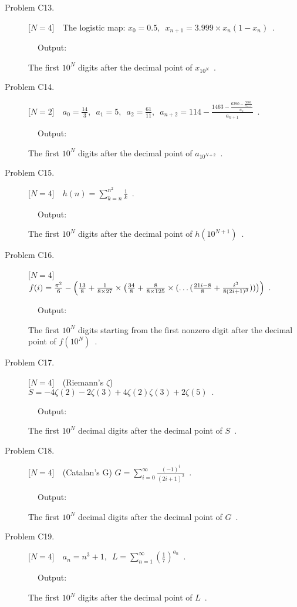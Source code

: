 \documentclass{article}
\begin{document}
\begin{description}
\item[Problem C13.] [$N=4$]~~The logistic map: $x_0=0.5,\enspace x_{n+1}=3.999\times x_{n} (1-x_{n})\enspace.$
\item[~~~~~~~~Output:]The first \ensuremath{10^N} digits after the decimal point of  $x_{\ensuremath{10^N}}\enspace$.

\item[Problem C14.] [$N=2$]~~$a_{0}=\frac{14}{3},\enspace a_{1}=5,\enspace a_{2}=\frac{61}{11},\enspace
            a_{n+2}=114-\frac{1463-\frac{6390-\frac{9000}{a_{n-1}}}{a_n}}{a_{n+1}}\enspace.$
\item[~~~~~~~~Output:]The first \ensuremath{10^N} digits after the decimal point of  $a_{10^{N+2}}\enspace$.

\item[Problem C15.] [$N=4$]~~$h(n)=\sum\limits_{k=n}^{n^2}\frac{1}{k}\enspace.$
\item[~~~~~~~~Output:]The first \ensuremath{10^N} digits after the decimal point of  $h(10^{N+1})\enspace$.

\item[Problem C16.] [$N=4$]~~$f(i)=\frac{\pi^2}{6}-\Big{(}\frac{13}{8}+\frac{1}{8{\times}27}\times\big{(}\frac{34}{8}
                +\frac{8}{8{\times}125}
              \times(\dots(\frac{21i-8}{8}+\frac{i^3}{8(2i+1)^3}))\big{)}\Big{)}\enspace.$
\item[~~~~~~~~Output:]The first \ensuremath{10^N} digits starting from the first nonzero digit after the decimal point of  $f(\ensuremath{10^N})\enspace$.

\item[Problem C17.] [$N=4$]~~(Riemann's $\zeta$) $S= -4\zeta(2) - 2\zeta(3) + 4\zeta(2)\zeta(3) + 2\zeta(5)\enspace.$
\item[~~~~~~~~Output:]The first \ensuremath{10^N} decimal digits after the decimal point of $S\enspace$.

\item[Problem C18.] [$N=4$]~~(Catalan's G) $G = \sum\limits_{i=0}^{\infty}\frac{(-1)^i}{(2i+1)^2}\enspace.$
\item[~~~~~~~~Output:]The first \ensuremath{10^N} decimal digits after the decimal point of $G\enspace$.

\item[Problem C19.] [$N=4$]~~$a_{n}=n^3+1,\enspace L= \sum\limits_{n=1}^{\infty} (\frac{1}{7})^{a_{n}}\enspace.$
\item[~~~~~~~~Output:]The first \ensuremath{10^N} digits after the decimal point of $L\enspace$.


\end{description}
\end{document}
